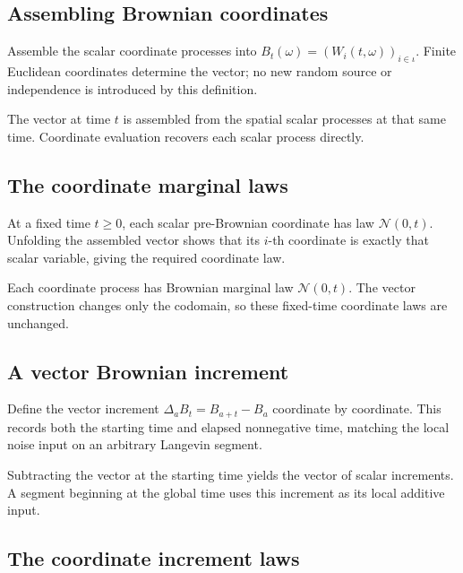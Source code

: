 \documentclass[11pt,a4paper]{report}
\begin{document}
\subsection{\texorpdfstring{Assembling Brownian coordinates}{Assembling Brownian coordinates}}
\label{report-step-UnadjustedLangevin-GaussianCoordinates-lean-8}


Assemble the scalar coordinate processes into \(B_t(\omega)=(W_i(t,\omega))_{i\in\iota}\). Finite Euclidean coordinates determine the vector; no new random source or independence is introduced by this definition.



The vector at time \(t\) is assembled from the spatial scalar processes at that same time. Coordinate evaluation recovers each scalar process directly.

\subsection{\texorpdfstring{The coordinate marginal laws}{The coordinate marginal laws}}
\label{report-step-UnadjustedLangevin-GaussianCoordinates-lean-9}


At a fixed time \(t\ge0\), each scalar pre-Brownian coordinate has law \(\mathcal N(0,t)\). Unfolding the assembled vector shows that its \(i\)-th coordinate is exactly that scalar variable, giving the required coordinate law.



Each coordinate process has Brownian marginal law \(\mathcal N(0,t)\). The vector construction changes only the codomain, so these fixed-time coordinate laws are unchanged.

\subsection{\texorpdfstring{A vector Brownian increment}{A vector Brownian increment}}
\label{report-step-UnadjustedLangevin-GaussianCoordinates-lean-10}


Define the vector increment \(\Delta_aB_t=B_{a+t}-B_a\) coordinate by coordinate. This records both the starting time and elapsed nonnegative time, matching the local noise input on an arbitrary Langevin segment.



Subtracting the vector at the starting time yields the vector of scalar increments. A segment beginning at the global time uses this increment as its local additive input.

\subsection{\texorpdfstring{The coordinate increment laws}{The coordinate increment laws}}
\label{report-step-UnadjustedLangevin-GaussianCoordinates-lean-11}
\end{document}
